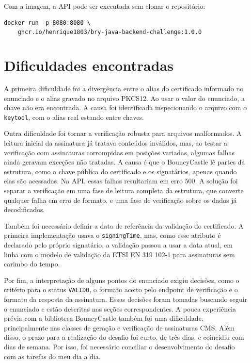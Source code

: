 \documentclass[12pt,a4paper]{article}
\begin{document}
Com a imagem, a API pode ser executada sem clonar o repositório:

\begin{lstlisting}
docker run -p 8080:8080 \
    ghcr.io/henrique1803/bry-java-backend-challenge:1.0.0
\end{lstlisting}

\section{Dificuldades encontradas}

A primeira dificuldade foi a divergência entre o alias do certificado informado no enunciado e o alias gravado no arquivo PKCS12. Ao usar o valor do enunciado, a chave não era encontrada. A causa foi identificada inspecionando o arquivo com o \texttt{keytool}, com o alias real estando entre chaves.

Outra dificuldade foi tornar a verificação robusta para arquivos malformados. A leitura inicial da assinatura já tratava conteúdos inválidos, mas, ao testar a verificação com assinaturas corrompidas em posições variadas, algumas falhas ainda geravam exceções não tratadas. A causa é que o BouncyCastle lê partes da estrutura, como a chave pública do certificado e os signatários, apenas quando elas são acessadas. Na API, essas falhas resultariam em erro 500. A solução foi separar a verificação em uma fase de leitura completa da estrutura, que converte qualquer falha em erro de formato, e uma fase de verificação sobre os dados já decodificados.

Também foi necessário definir a data de referência da validação do certificado. A primeira implementação usava o \texttt{signingTime}, mas, como esse atributo é declarado pelo próprio signatário, a validação passou a usar a data atual, em linha com o modelo de validação da ETSI EN 319 102-1 para assinaturas sem carimbo do tempo.

Por fim, a interpretação de alguns pontos do enunciado exigiu decisões, como o critério para o status \texttt{VALIDO}, o formato aceito pelo endpoint de verificação e o formato da resposta da assinatura. Essas decisões foram tomadas buscando seguir o enunciado e estão descritas nas seções correspondentes. A pouca experiência prévia com a biblioteca BouncyCastle também foi uma dificuldade, principalmente nas classes de geração e verificação de assinaturas CMS. Além disso, o prazo para a realização do desafio foi curto, de três dias, e coincidiu com dias de semana. Por isso, foi necessário conciliar o desenvolvimento do desafio com as tarefas do meu dia a dia.
\end{document}

